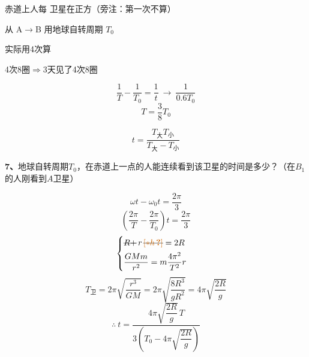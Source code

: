 \begin{problem}
赤道上人每\,\,卫星在正方（旁注：第一次不算）

从 A$\to$B 用\quad 地球自转周期 $T_0$
\begin{solution}
\quad 实际用4次算

4次\quad 8圈\quad $\Longrightarrow$\quad 3天见了4次\quad 8圈

\quad {}

\[ \dfrac{1}{T}-\dfrac{1}{T_0}=\dfrac{1}{t}\ \to\ \dfrac{1}{0.6T_0} \]
\[ T=\dfrac{3}{8}T_0 \]

\[ t=\dfrac{T_{\text{大}}T_{\text{小}}}{T_{\text{大}}-T_{\text{小}}} \]
\end{solution}
\end{problem}

\begin{problem}[7]
\textbf{7、}地球自转周期$T_0$，在赤道上一点的人能连续看到该卫星的时间是多少？（在$B_1$的人刚看到$A$卫星）
\begin{solution}
\[ \omega t-\omega_0 t=\dfrac{2\pi}{3} \]
\[ \left(\dfrac{2\pi}{T}-\dfrac{2\pi}{T_0}\right)t=\dfrac{2\pi}{3} \]
\[ \begin{cases}
\text{\struck{$R+$}}\,r\,\text{\struck{\unclear{$\ast h$}}}=2R\\[4pt]
\dfrac{GMm}{r^2}=m\dfrac{4\pi^2}{T^2}r
\end{cases} \] %
\[ T_{\text{卫}}=2\pi\sqrt{\dfrac{r^3}{GM}}=2\pi\sqrt{\dfrac{8R^3}{gR^2}}=4\pi\sqrt{\dfrac{2R}{g}} \] %
\noindent{} %
\[ \therefore\ t=\dfrac{4\pi\sqrt{\dfrac{2R}{g}}\,T}{3\left(T_0-4\pi\sqrt{\dfrac{2R}{g}}\right)} \] %
\end{solution}
\end{problem}

